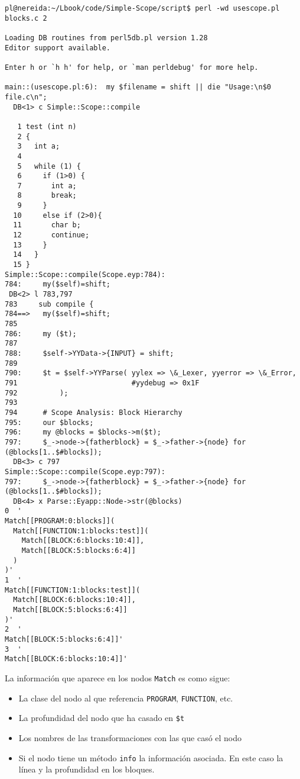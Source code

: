 \begin{verbatim}
pl@nereida:~/Lbook/code/Simple-Scope/script$ perl -wd usescope.pl blocks.c 2

Loading DB routines from perl5db.pl version 1.28
Editor support available.

Enter h or `h h' for help, or `man perldebug' for more help.

main::(usescope.pl:6):  my $filename = shift || die "Usage:\n$0 file.c\n";
  DB<1> c Simple::Scope::compile

   1 test (int n)
   2 {
   3   int a;
   4
   5   while (1) {
   6     if (1>0) {
   7       int a;
   8       break;
   9     }
  10     else if (2>0){
  11       char b;
  12       continue;
  13     }
  14   }
  15 }
Simple::Scope::compile(Scope.eyp:784):
784:     my($self)=shift;
 DB<2> l 783,797
783     sub compile {
784==>   my($self)=shift;
785
786:     my ($t);
787
788:     $self->YYData->{INPUT} = shift;
789
790:     $t = $self->YYParse( yylex => \&_Lexer, yyerror => \&_Error,
791                           #yydebug => 0x1F
792          );
793
794      # Scope Analysis: Block Hierarchy
795:     our $blocks;
796:     my @blocks = $blocks->m($t);
797:     $_->node->{fatherblock} = $_->father->{node} for (@blocks[1..$#blocks]);
  DB<3> c 797
Simple::Scope::compile(Scope.eyp:797):
797:     $_->node->{fatherblock} = $_->father->{node} for (@blocks[1..$#blocks]);
  DB<4> x Parse::Eyapp::Node->str(@blocks)
0  '
Match[[PROGRAM:0:blocks]](
  Match[[FUNCTION:1:blocks:test]](
    Match[[BLOCK:6:blocks:10:4]],
    Match[[BLOCK:5:blocks:6:4]]
  )
)'
1  '
Match[[FUNCTION:1:blocks:test]](
  Match[[BLOCK:6:blocks:10:4]],
  Match[[BLOCK:5:blocks:6:4]]
)'
2  '
Match[[BLOCK:5:blocks:6:4]]'
3  '
Match[[BLOCK:6:blocks:10:4]]'
\end{verbatim}
La información que aparece en los nodos \verb|Match| es como sigue:
\begin{itemize}
\item
La clase del nodo al que referencia \verb|PROGRAM|, \verb|FUNCTION|, etc.
\item
La profundidad del nodo que ha casado en \verb|$t|
\item
Los nombres de las transformaciones con las que casó el nodo
\item
Si el nodo tiene un método \verb|info| la información asociada.
En este caso la línea y la profundidad en los bloques.
\end{itemize}

